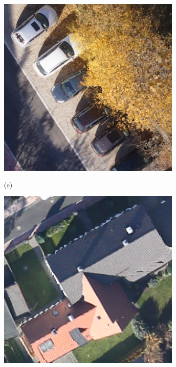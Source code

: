 \begin{figure}[tbp]
\begin{subfigure}[tbp]{0.236\columnwidth}
           \centering
           \includegraphics[width=\textwidth]{figures_5/eichenau_car_uav.png}
           {{\small }}    
           \centerline{\small{(e)}}\medskip
       \end{subfigure} 
       \hfill
       \begin{subfigure}[tbp]{0.236\columnwidth}
           \centering
           \includegraphics[width=\textwidth]{figures_5/eichenau_roof_aerial.png}

\end{subfigure}
\end{figure}
